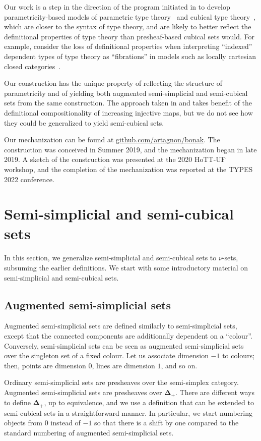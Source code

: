 \documentclass{art.cls/art}
\newcommand{\DeltaPlus}{\ensuremath{\boldsymbol{\Delta}_+}}
\begin{document}
Our work is a step in the direction of the program initiated in \cite{altenkirch15} to develop parametricity-based models of parametric type theory~\cite{bernardy15,nuyts17,cavallo19} and cubical type theory~\cite{bezem13,cohen16,angiuli21}, which are closer to the syntax of type theory, and are likely to better reflect the definitional properties of type theory than presheaf-based cubical sets would. For example, consider the loss of definitional properties when interpreting ``indexed'' dependent types of type theory as ``fibrations'' in models such as locally cartesian closed categories~\cite{curien14}.

Our construction has the unique property of reflecting the structure of parametricity and of yielding both augmented semi-simplicial and semi-cubical sets from the same construction. The approach taken in \cite{part15} and \cite{altenkirch16} takes benefit of the definitional compositionality of increasing injective maps, but we do not see how they could be generalized to yield semi-cubical sets.

Our mechanization can be found at \href{https://github.com/artagnon/bonak}{github.com/artagnon/bonak}. The construction was conceived in Summer 2019, and the mechanization began in late 2019. A sketch of the construction was presented at the 2020 HoTT-UF workshop, and the completion of the mechanization was reported at the TYPES 2022 conference.

\section{Semi-simplicial and semi-cubical sets\label{sec:nu}}
In this section, we generalize semi-simplicial and semi-cubical sets to $\nu$-sets, subsuming the earlier definitions. We start with some introductory material on semi-simplicial and semi-cubical sets.

\subsection*{Augmented semi-simplicial sets}
Augmented semi-simplicial sets are defined similarly to semi-simplicial sets, except that the connected components are additionally dependent on a ``colour''. Conversely, semi-simplicial sets can be seen as augmented semi-simplicial sets over the singleton set of a fixed colour. Let us associate dimension $-1$ to colours; then, points are dimension $0$, lines are dimension $1$, and so on.

Ordinary semi-simplicial sets are presheaves over the semi-simplex category. Augmented semi-simplicial sets are presheaves over \DeltaPlus. There are different ways to define \DeltaPlus, up to equivalence, and we use a definition that can be extended to semi-cubical sets in a straightforward manner. In particular, we start numbering objects from $0$ instead of $-1$ so that there is a shift by one compared to the standard numbering of augmented semi-simplicial sets.
\end{document}
